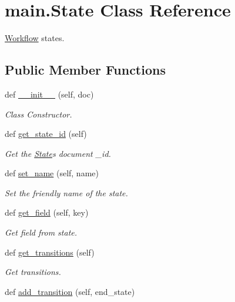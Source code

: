 \hypertarget{classmain_1_1_state}{}\section{main.\+State Class Reference}
\label{classmain_1_1_state}


\hyperlink{classmain_1_1_workflow}{Workflow} states.  


\subsection*{Public Member Functions}
\begin{DoxyCompactItemize}
\item 
def \hyperlink{classmain_1_1_state_aacbb891da95994d68a8868b7673ab926}{\+\_\+\+\_\+init\+\_\+\+\_\+} (self, doc)
\begin{DoxyCompactList}\small\item\em Class Constructor. \end{DoxyCompactList}\item 
def \hyperlink{classmain_1_1_state_ab1a28b634cd9719c4c35e842298d6591}{get\+\_\+state\+\_\+id} (self)
\begin{DoxyCompactList}\small\item\em Get the \hyperlink{classmain_1_1_state}{State}\textquotesingle{}s document \+\_\+id. \end{DoxyCompactList}\item 
def \hyperlink{classmain_1_1_state_af568033ce6715a39af545ac50b7eed6d}{set\+\_\+name} (self, name)
\begin{DoxyCompactList}\small\item\em Set the friendly name of the state. \end{DoxyCompactList}\item 
def \hyperlink{classmain_1_1_state_a3bf392c555bcb78bbfb9c8e5da231b43}{get\+\_\+field} (self, key)
\begin{DoxyCompactList}\small\item\em Get field from state. \end{DoxyCompactList}\item 
def \hyperlink{classmain_1_1_state_ab7754ebb0b762942c2038b06f1df2381}{get\+\_\+transitions} (self)
\begin{DoxyCompactList}\small\item\em Get transitions. \end{DoxyCompactList}\item 
def \hyperlink{classmain_1_1_state_abedfeb6b751dfccd598b0814143a6f09}{add\+\_\+transition} (self, end\+\_\+state)

\end{DoxyCompactItemize}
